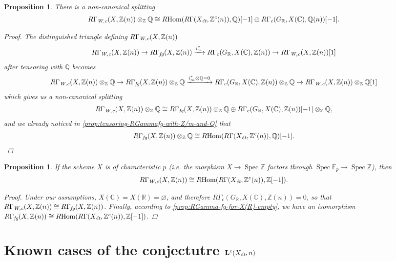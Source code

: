\documentclass{article}
\DeclareMathOperator{\Hom}{Hom}
\DeclareMathOperator{\Spec}{Spec}
\newcommand{\CC}{\mathbb{C}}
\newcommand{\FF}{\mathbb{F}}
\newcommand{\QQ}{\mathbb{Q}}
\newcommand{\RR}{\mathbb{R}}
\newcommand{\ZZ}{\mathbb{Z}}
\renewcommand{\emptyset}{\varnothing}
\newcommand{\et}{\text{\it ét}}
\newcommand{\fg}{\text{\it fg}}
\newcommand{\Wc}{\text{\it W,c}}
\newcommand{\RHom}{R\!\Hom}
\newtheorem{proposition}[theorem]{Proposition}
\theoremstyle{definition}
\numberwithin{equation}{section}
\begin{document}
\begin{proposition}
  There is a non-canonical splitting
  \[ R\Gamma_\Wc (X, \ZZ(n)) \otimes_\ZZ \QQ \cong
  \RHom (R\Gamma (X_\et, \ZZ^c (n)), \QQ) [-1] \oplus
  R\Gamma_c (G_\RR, X (\CC), \QQ (n)) [-1]. \]

  \begin{proof}
    The distinguished triangle defining $R\Gamma_\Wc (X, \ZZ(n))$
    \[ R\Gamma_\Wc (X, \ZZ (n)) \to
    R\Gamma_\fg (X, \ZZ(n)) \xrightarrow{i_\infty^*}
    R\Gamma_c (G_\RR, X (\CC), \ZZ(n)) \to
    R\Gamma_\Wc (X, \ZZ (n)) [1] \]
    after tensoring with $\QQ$ becomes
    \[ R\Gamma_\Wc (X, \ZZ (n))\otimes_\ZZ \QQ \to
    R\Gamma_\fg (X, \ZZ(n))\otimes_\ZZ \QQ \xrightarrow{i_\infty^*\otimes\QQ = 0}
    R\Gamma_c (G_\RR, X (\CC), \ZZ(n))\otimes_\ZZ \QQ \to
    R\Gamma_\Wc (X, \ZZ (n))\otimes_\ZZ \QQ [1] \]
    which gives us a non-canonical splitting
    \cite[Chapitre~II, Corollaire~1.2.6]{Verdier-thesis}
    \[ R\Gamma_\Wc (X, \ZZ (n))\otimes_\ZZ \QQ \cong
    R\Gamma_\fg (X, \ZZ(n))\otimes_\ZZ \QQ \oplus
    R\Gamma_c (G_\RR, X (\CC), \ZZ(n)) [-1]\otimes_\ZZ \QQ, \]
    and we already noticed in \ref{prop:tensoring-RGammafg-with-Z/m-and-Q} that
    \[ R\Gamma_\fg (X, \ZZ (n)) \otimes_\ZZ \QQ \cong
    \RHom (R\Gamma (X_\et, \ZZ^c (n)), \QQ) [-1]. \qedhere \]
  \end{proof}
\end{proposition}

\begin{proposition}
  If the scheme $X$ is of characteristic $p$ (i.e. the morphism
  $X \to \Spec \ZZ$ factors through $\Spec \FF_p \to \Spec \ZZ$), then
  $$R\Gamma_\Wc (X,\ZZ(n)) \cong \RHom (R\Gamma (X_\et, \ZZ^c (n)), \ZZ [-1]).$$

  \begin{proof}
    Under our assumptions, $X (\CC) = X (\RR) = \emptyset$, and therefore
    $R\Gamma_c (G_\RR, X (\CC), \ZZ (n)) = 0$, so that
    $R\Gamma_\Wc (X,\ZZ(n)) \cong R\Gamma_\fg (X, \ZZ (n))$.
    Finally, according to \ref{prop:RGamma-fg-for-X(R)-empty}, we have
    an isomorphism
    $R\Gamma_\fg (X, \ZZ (n)) \cong \RHom (R\Gamma (X_\et, \ZZ^c (n)), \ZZ [-1])$.
  \end{proof}
\end{proposition}


\section{Known cases of the conjectutre $\mathbf{L}^c (X_\et,n)$}
\label{sec:known-cases-of-Lc-Xet-n}
\end{document}
